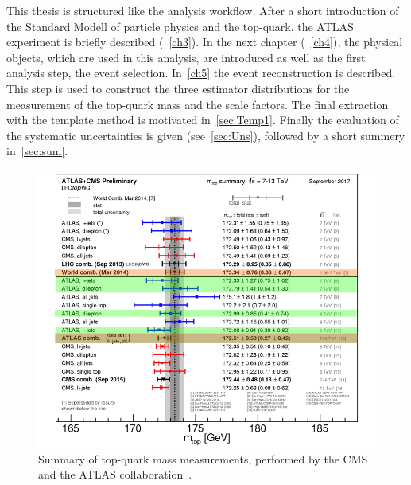 This thesis is structured like the analysis workflow. After a short introduction of the Standard Modell of particle physics and the top-quark, the ATLAS experiment is briefly described (~\cref{ch3}). In the next chapter (~\cref{ch4}), the physical objects, which are used in this analysis, are introduced as well as the first analysis step, the event selection. In~\cref{ch5} the event reconstruction is described. This step is used to construct the three estimator distributions for the measurement of the top-quark mass and the scale factors. The final extraction with the template method is motivated in~\cref{sec:Temp1}. Finally the evaluation of the systematic uncertainties is given (see~\cref{sec:Uns}), followed by a short summery in~\cref{sec:sum}.




\begin{figure}[h]
	\centering
	\includegraphics[width=0.75\linewidth]{Pics/mass}
	\caption{Summary of top-quark mass measurements, performed by the CMS and the ATLAS collaboration~\cite{PubR}. }
	
	\label{fig:mass}
\end{figure}



